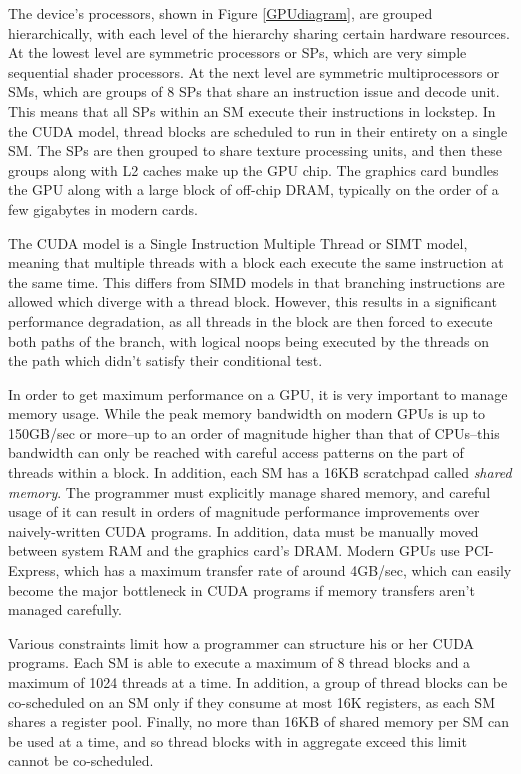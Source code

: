 \documentclass[preprint]{sigplanconf}
\begin{document}
The device's processors, shown in Figure \ref{GPUdiagram}, are grouped hierarchically, with each level of the hierarchy sharing certain hardware resources.  At the lowest level are symmetric processors or SPs, which are very simple sequential shader processors.  At the next level are symmetric multiprocessors or SMs, which are groups of 8 SPs that share an instruction issue and decode unit.  This means that all SPs within an SM execute their instructions in lockstep.  In the CUDA model, thread blocks are scheduled to run in their entirety on a single SM.  The SPs are then grouped to share texture processing units, and then these groups along with L2 caches make up the GPU chip.  The graphics card bundles the GPU along with a large block of off-chip DRAM, typically on the order of a few gigabytes in modern cards.

The CUDA model is a Single Instruction Multiple Thread or SIMT model, meaning that multiple threads with a block each execute the same instruction at the same time.  This differs from SIMD models in that branching instructions are allowed which diverge with a thread block.  However, this results in a significant performance degradation, as all threads in the block are then forced to execute both paths of the branch, with logical noops being executed by the threads on the path which didn't satisfy their conditional test.

In order to get maximum performance on a GPU, it is very important to manage memory usage.  While the peak memory bandwidth on modern GPUs is up to 150GB/sec or more--up to an order of magnitude higher than that of CPUs--this bandwidth can only be reached with careful access patterns on the part of threads within a block.  In addition, each SM has a 16KB scratchpad called {\it shared memory}.  The programmer must explicitly manage shared memory, and careful usage of it can result in orders of magnitude performance improvements over naively-written CUDA programs.  In addition, data must be manually moved between system RAM and the graphics card's DRAM.  Modern GPUs use PCI-Express, which has a maximum transfer rate of around 4GB/sec, which can easily become the major bottleneck in CUDA programs if memory transfers aren't managed carefully.

Various constraints limit how a programmer can structure his or her CUDA programs.  Each SM is able to execute a maximum of 8 thread blocks and a maximum of 1024 threads at a time.  In addition, a group of thread blocks can be co-scheduled on an SM only if they consume at most 16K registers, as each SM shares a register pool.  Finally, no more than 16KB of shared memory per SM can be used at a time, and so thread blocks with in aggregate exceed this limit cannot be co-scheduled.
\end{document}
